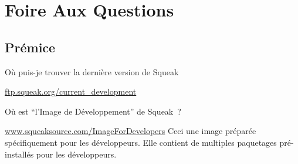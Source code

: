 \documentclass[a4paper,10pt,twoside]{book}
\begin{document}
	\renewcommand{\nnbb}[2]{} %
	\sloppy
\fi
  
\chapter{Foire Aux Questions}
\label{cha:faq}


\section{Pr\'emice}
\begin{faq}
O\`u puis-je trouver la derni\`ere version de Squeak
\end{faq}
\answer
\url{ftp.squeak.org/current_development}

\begin{faq}
O\`u est ``l'Image de D\'eveloppement'' de Squeak~?
\end{faq}
\answer
\url{www.squeaksource.com/ImageForDevelopers}
Ceci une image pr\'epar\'ee sp\'ecifiquement pour les d\'eveloppeurs. Elle contient de multiples 
paquetages pr\'e-install\'es pour les d\'eveloppeurs.
\end{document}
